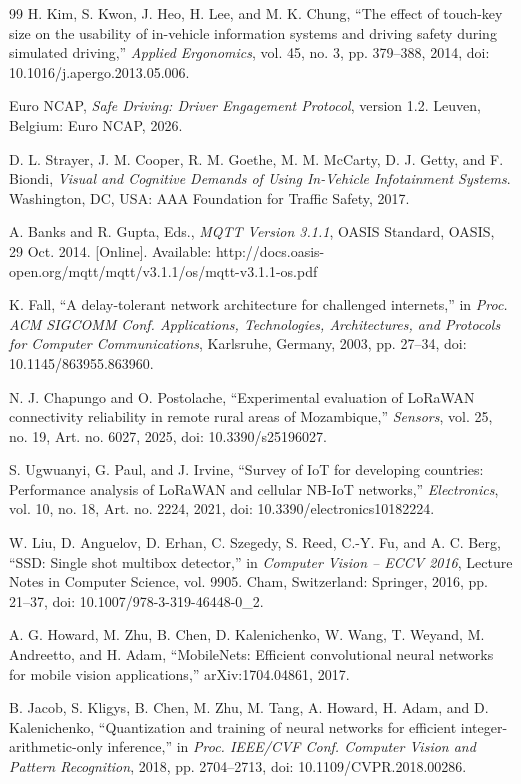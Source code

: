 \begin{thebibliography}{99}
 H. Kim, S. Kwon, J. Heo, H. Lee, and M. K. Chung, ``The effect of touch-key size on the usability of in-vehicle information systems and driving safety during simulated driving,'' \emph{Applied Ergonomics}, vol. 45, no. 3, pp. 379--388, 2014, doi: 10.1016/j.apergo.2013.05.006.

 Euro NCAP, \emph{Safe Driving: Driver Engagement Protocol}, version 1.2. Leuven, Belgium: Euro NCAP, 2026.

 D. L. Strayer, J. M. Cooper, R. M. Goethe, M. M. McCarty, D. J. Getty, and F. Biondi, \emph{Visual and Cognitive Demands of Using In-Vehicle Infotainment Systems}. Washington, DC, USA: AAA Foundation for Traffic Safety, 2017.

 A. Banks and R. Gupta, Eds., \emph{MQTT Version 3.1.1}, OASIS Standard, OASIS, 29 Oct. 2014. [Online]. Available: http://docs.oasis-open.org/mqtt/mqtt/v3.1.1/os/mqtt-v3.1.1-os.pdf

 K. Fall, ``A delay-tolerant network architecture for challenged internets,'' in \emph{Proc. ACM SIGCOMM Conf. Applications, Technologies, Architectures, and Protocols for Computer Communications}, Karlsruhe, Germany, 2003, pp. 27--34, doi: 10.1145/863955.863960.

 N. J. Chapungo and O. Postolache, ``Experimental evaluation of LoRaWAN connectivity reliability in remote rural areas of Mozambique,'' \emph{Sensors}, vol. 25, no. 19, Art. no. 6027, 2025, doi: 10.3390/s25196027.

 S. Ugwuanyi, G. Paul, and J. Irvine, ``Survey of IoT for developing countries: Performance analysis of LoRaWAN and cellular NB-IoT networks,'' \emph{Electronics}, vol. 10, no. 18, Art. no. 2224, 2021, doi: 10.3390/electronics10182224.

 W. Liu, D. Anguelov, D. Erhan, C. Szegedy, S. Reed, C.-Y. Fu, and A. C. Berg, ``SSD: Single shot multibox detector,'' in \emph{Computer Vision -- ECCV 2016}, Lecture Notes in Computer Science, vol. 9905. Cham, Switzerland: Springer, 2016, pp. 21--37, doi: 10.1007/978-3-319-46448-0\_2.

 A. G. Howard, M. Zhu, B. Chen, D. Kalenichenko, W. Wang, T. Weyand, M. Andreetto, and H. Adam, ``MobileNets: Efficient convolutional neural networks for mobile vision applications,'' arXiv:1704.04861, 2017.

 B. Jacob, S. Kligys, B. Chen, M. Zhu, M. Tang, A. Howard, H. Adam, and D. Kalenichenko, ``Quantization and training of neural networks for efficient integer-arithmetic-only inference,'' in \emph{Proc. IEEE/CVF Conf. Computer Vision and Pattern Recognition}, 2018, pp. 2704--2713, doi: 10.1109/CVPR.2018.00286.


\end{thebibliography}
